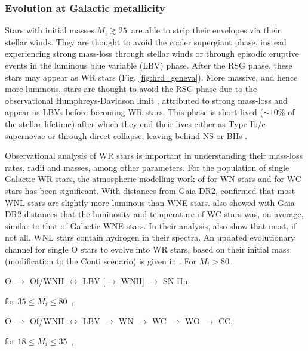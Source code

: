 \subsubsection{Evolution at Galactic metallicity} \label{sect:evo_galactic}

Stars with initial masses $M_i \gtrsim 25\,$\Msun{} are able to strip their envelopes via their stellar winds. They are thought to avoid the cooler supergiant phase, instead experiencing strong mass-loss through stellar winds or through episodic eruptive events in the luminous blue variable (LBV) phase. After the \b{RSG} phase, these stars may appear as WR stars (Fig. \ref{fig:hrd_geneva}). \b{More massive, and hence more luminous, stars are thought to avoid the RSG phase due to the observational Humphreys-Davidson limit \citep[][]{1979HD_limit}, attributed to strong mass-loss and appear as LBVs before becoming WR stars.} This phase is short-lived (${\sim}10$\% of the stellar lifetime) after which they end their lives either as Type Ib/c supernovae or through direct collapse, leaving behind NS or BHs \citep{heger_how_2003}.

Observational analysis of WR stars is important in understanding their mass-loss rates, radii and masses, among other parameters. For the population of single Galactic WR stars, the atmospheric-modelling work of \citet{hamann_galactic_2019} for WN stars and \citet{sander_galactic_2019} for WC stars has been significant. With distances from Gaia DR2, \citet{hamann_galactic_2019} confirmed that most WNL stars are slightly more luminous than WNE stars. \citet{sander_galactic_2019} also showed with Gaia DR2 distances that the luminosity and temperature of WC stars was, on average, similar to that of Galactic WNE stars. In their analysis, \citet{hamann_galactic_2019} also show that most, if not all, WNL stars contain hydrogen in their spectra. An updated evolutionary channel for single O stars to evolve into WR stars, based on their initial mass (modification to the Conti scenario) is given in \citet{sander_galactic_2019}. For $M_i > 80\,$\Msun{},

\centerline{O $\longrightarrow$ Of/WNH $\longleftrightarrow$ LBV  [$\longrightarrow$ WNH] $\longrightarrow$ SN IIn,}

for $35 \le M_i \le 80\,$ \Msun{},

\centerline{O $\longrightarrow$ Of/WNH $\longleftrightarrow$ LBV  $\longrightarrow$ WN $\longrightarrow$ WC $\longrightarrow$ WO $\longrightarrow$ CC,}

for $18 \le M_i \le 35\,$ \Msun{},

